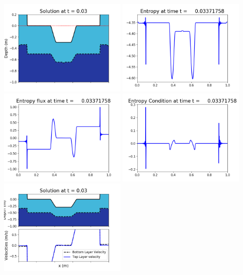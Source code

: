 \documentclass[11pt]{article}
\begin{document}
\includegraphics[width=0.475\textwidth]{frame0078fig1006.png}
\vskip 10pt 
\includegraphics[width=0.475\textwidth]{frame0078fig1007.png}
\includegraphics[width=0.475\textwidth]{frame0078fig1008.png}
\vskip 10pt 
\includegraphics[width=0.475\textwidth]{frame0078fig1009.png}
\vskip 10pt 
\includegraphics[width=0.475\textwidth]{frame0079fig1001.png}
\end{document}

